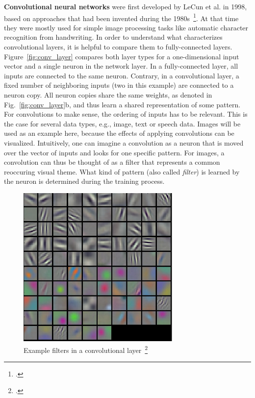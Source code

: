 \textbf{Convolutional neural networks} were first developed by LeCun et al. in 1998,
based on approaches that had been invented during the 1980s~\footcite{Fukushima1980, LeCun1998}.
At that time they were mostly used for simple image processing tasks like
automatic character recognition from handwriting.
In order to understand what characterizes convolutional layers, it is helpful
to compare them to fully-connected layers.
Figure~\ref{fig:conv_layer} compares both layer types for a one-dimensional
input vector and a single neuron in the network layer.
In a fully-connected layer, all inputs are connected to the same neuron.
Contrary, in a convolutional layer, a fixed number of neighboring inputs (two in this example)
are connected to a neuron copy.
All neuron copies share the same weights, as denoted in Fig.~\ref{fig:conv_layer}b,
and thus learn a shared representation of some pattern.
For convolutions to make sense, the ordering of inputs has to be relevant.
This is the case for several data types, e.g., image, text or speech data.
Images will be used as an example here, because the effects of applying
convolutions can be visualized.
Intuitively, one can imagine a convolution as a neuron that is moved over the
vector of inputs and looks for one specific pattern.
For images, a convolution can thus be thought of as a filter that represents
a common reoccuring visual theme.
What kind of pattern (also called \textit{filter}) is learned by the neuron is
determined during the training process.

\begin{figure}[h]
  \centering
  \includegraphics[height=8cm]{img/conv_filters.jpeg}
  \caption[Example filters in a convolutional layer]{Example filters in a convolutional layer~\footcite{Krizhevsky2012}}
\label{fig:conv_examples}
\end{figure}

